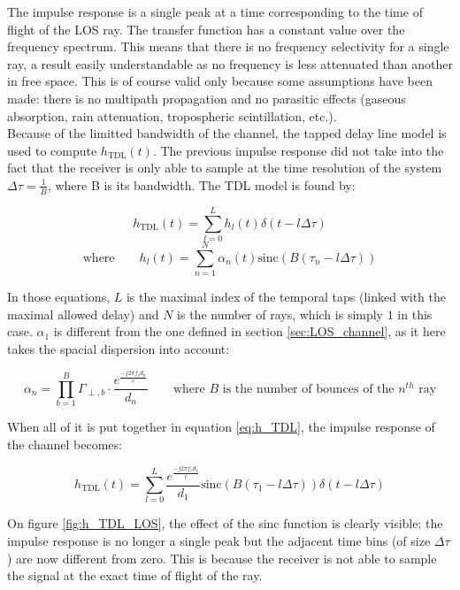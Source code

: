 \documentclass[10pt,a4paper]{ULBreport}
\begin{document}
The impulse response is a single peak at a time corresponding to the time of flight of the LOS ray. The transfer function has a constant value over the frequency spectrum. This means that there is no frequency selectivity for a single ray, a result easily understandable as no frequency is less attenuated than another in free space. This is of course valid only because some assumptions have been made: there is no multipath propagation and no parasitic effects (gaseous absorption, rain attenuation, tropospheric scintillation, etc.).\\
Because of the limitted bandwidth of the channel, the tapped delay line model is used to compute $h_{\text{TDL}}(t)$. The previous impulse response did not take into the fact that the receiver is only able to sample at the time resolution of the system $\Delta\tau = \frac{1}{B}$, where B is its bandwidth. The TDL model is found by:

\begin{equation}
    h_{\text{TDL}}(t) = \sum_{l=0}^{L} h_l(t) \delta(t - l\Delta\tau)
    \label{eq:h_TDL}
\end{equation}
\begin{equation*}
    \text{where} \qquad h_l(t) = \sum_{n=1}^{N} \alpha_n(t) \text{sinc}\left(B(\tau_n - l\Delta\tau)\right)
\end{equation*}

In those equations, $L$ is the maximal index of the temporal taps (linked with the maximal allowed delay) and $N$ is the number of rays, which is simply $1$ in this case. $\alpha_1$ is different from the one defined in section \ref{sec:LOS_channel}, as it here takes the spacial dispersion into account:

\begin{equation*}
    \alpha_n = \prod_{b=1}^{B} \Gamma_{\perp, b} \cdot \frac{e^{\frac{-j2\pi f_c d_n}{c}}}{d_n} \qquad \text{where } B \text{ is the number of bounces of the } n^{th} \text{ ray}
\end{equation*}

When all of it is put together in equation \ref{eq:h_TDL}, the impulse response of the channel becomes:

\begin{equation*}
    h_{\text{TDL}}(t) = \sum_{l=0}^{L}\frac{e^{\frac{-j2\pi f_c d_1}{c}}}{d_1} \text{sinc}\left(B(\tau_1 - l\Delta\tau)\right) \delta(t - l\Delta\tau)
\end{equation*}

On figure \ref{fig:h_TDL_LOS}, the effect of the sinc function is clearly visible: the impulse response is no longer a single peak but the adjacent time bins (of size $\Delta\tau$) are now different from zero. This is because the receiver is not able to sample the signal at the exact time of flight of the ray. \\
\end{document}

